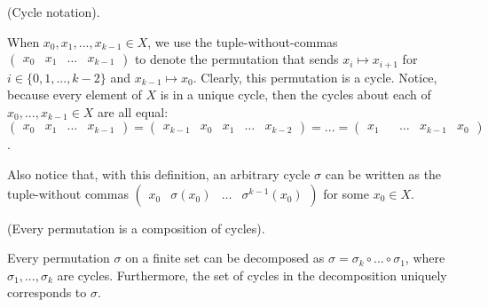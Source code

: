 \begin{defn}
    (Cycle notation).

    When $x_0, x_1, ..., x_{k - 1} \in X$, we use the tuple-without-commas $\begin{pmatrix} x_0 & x_1 & \hdots & x_{k - 1} \end{pmatrix}$ to denote the permutation that sends $x_i \mapsto x_{i + 1}$ for $i \in \{0, 1, ..., k - 2\}$ and $x_{k - 1} \mapsto x_0$. Clearly, this permutation is a cycle. Notice, because every element of $X$ is in a unique cycle, then the cycles about each of $x_0, ..., x_{k - 1} \in X$ are all equal: $\begin{pmatrix} x_0 & x_1 & \hdots & x_{k - 1} \end{pmatrix}
    =
    \begin{pmatrix} x_{k - 1} & x_0 & x_1 & \hdots & x_{k - 2} \end{pmatrix}
    =
    ...
    =
    \begin{pmatrix} x_1 & & \hdots & x_{k - 1} & x_0 \end{pmatrix}$.

    Also notice that, with this definition, an arbitrary cycle $\sigma$ can be written as the tuple-without commas $\begin{pmatrix} x_0 & \sigma(x_0) & \hdots & \sigma^{k - 1}(x_0) \end{pmatrix}$ for some $x_0 \in X$.
\end{defn}

\begin{theorem}
    (Every permutation is a composition of cycles).

    Every permutation $\sigma$ on a finite set can be decomposed as $\sigma = \sigma_k \circ ... \circ \sigma_1$, where $\sigma_1, ..., \sigma_k$ are cycles. Furthermore, the set of cycles in the decomposition uniquely corresponds to $\sigma$.
\end{theorem}

